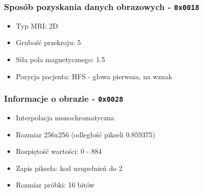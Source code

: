 \begin{frame}
  \frametitle{Sposób pozyskania danych obrazowych - \texttt{0x0018}}

  \begin{itemize}
    \item Typ MRI: 2D
    \item Grubość przekroju: 5
    \item Siła pola magnetycznego: 1.5
    \item Pozycja pacjenta: HFS - głowa pierwsza, na wznak
  \end{itemize}
\end{frame}


\begin{frame}
  \frametitle{Informacje o obrazie - \texttt{0x0028}}
\begin{itemize}
  \item Interpolacja monochromatyczna
  \item Rozmiar 256x256 (odległość pikseli 0.859375)
  \item Rozpiętość wartości: 0 - 884
  \item Zapis piksela: kod uzupełnień do 2
  \item Rozmiar próbki: 16 bitów
\end{itemize}
\end{frame}
